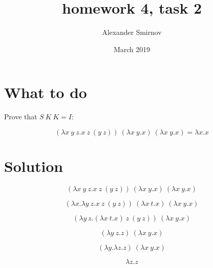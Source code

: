 \documentclass{article}
\title{homework 4, task 2}
\author{Alexander Smirnov}
\date{March 2019}
\begin{document}
\maketitle

\section{What to do}
Prove that $S\:K\:K = I: $

$$(\lambda x\:y\:z.x\:z\:(y\:z))\:(\lambda x\:y.x)\:(\lambda x\:y.x)=\lambda x.x$$

\section{Solution}

$$(\lambda x\:y\:z.x\:z\:(y\:z))\:(\lambda x\:y.x)\:(\lambda x\:y.x)$$

$$(\lambda x.\lambda y\:z.x\:z\:(y\:z))\:(\lambda x\:t.x)\:(\lambda x\:y.x)$$

$$(\lambda y\:z.(\lambda x\:t.x)\:z\:(y\:z))\:(\lambda x\:y.x)$$

$$(\lambda y\:z.z)\:(\lambda x\:y.x)$$

$$(\lambda y.\lambda z.z)\:(\lambda x\:y.x)$$

$$\lambda z.z$$
\end{document}
